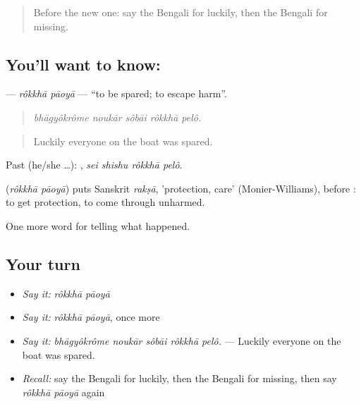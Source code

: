 \label{lesson:BN-C281-rokkha-paoya}



\begin{quote}
Before the new one: say the Bengali for luckily, then the Bengali for missing.
\end{quote}

\subsection*{You'll want to know:  }
\textbf{ } — \emph{rôkkhā pāoyā} — \textquotedblleft{}to be spared; to escape harm\textquotedblright{}.

\begin{quote}
    
\end{quote}

\begin{quote}
\emph{bhāgyôkrôme noukār sôbāi rôkkhā pelô.}
\end{quote}

\begin{quote}
Luckily everyone on the boat was spared.
\end{quote}

Past (he/she …):    , \emph{sei shishu rôkkhā pelô}.

\begin{cousinweb}
\textbf{ } (\emph{rôkkhā pāoyā}) puts Sanskrit \emph{rakṣā}, 'protection, care' (Monier-Williams), before \textbf{}: to get protection, to come through unharmed.
\end{cousinweb}

\begin{grammarlens}[title={What you've built}]
One more word for telling what happened.
\end{grammarlens}

\subsection*{Your turn}
\begin{itemize}
\raggedright
  \item \emph{Say it:} \emph{rôkkhā pāoyā}
  \item \emph{Say it:} \emph{rôkkhā pāoyā}, once more
  \item \emph{Say it:} \emph{bhāgyôkrôme noukār sôbāi rôkkhā pelô.} — Luckily everyone on the boat was spared.
  \item \emph{Recall:} say the Bengali for luckily, then the Bengali for missing, then say \emph{rôkkhā pāoyā} again
\end{itemize}

